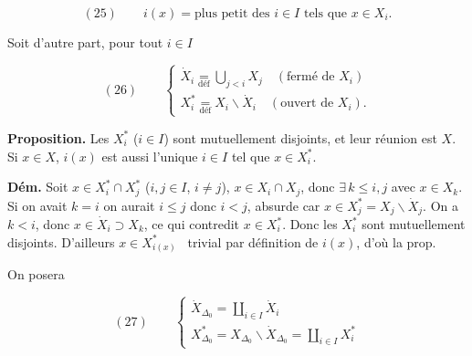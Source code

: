 \documentclass[11pt,a4paper]{article}
\begin{document}
\[
  (25) \qquad i(x) = \text{plus petit des } i \in I
  \text{ tels que } x \in X_i .
\]

Soit d'autre part, pour tout $i \in I$

\[
  (26) \qquad
  \begin{cases}
    \dot{X}_i \underset{\text{déf}}{=} \bigcup_{j < i} X_j
      \quad (\text{fermé de } X_i) \\[2pt]
    X_i^{*} \underset{\text{déf}}{=} X_i \smallsetminus \dot{X}_i
      \quad (\text{ouvert de } X_i) .
  \end{cases}
\]



\textbf{Proposition.} Les $X_i^{*}$ ($i \in I$) sont mutuellement disjoints,
et leur réunion est $X$. Si $x \in X$, $i(x)$ est aussi l'unique $i \in I$ tel
que $x \in X_i^{*}$.

\textbf{Dém.} Soit $x \in X_i^{*} \cap X_j^{*}$ ($i,j \in I$, $i \neq j$),
 $x \in X_i \cap X_j$, donc $\exists\, k \leq i,j$ \struck{\ill}
avec $x \in X_k$. Si on avait $k = i$ on aurait $i \leq j$ donc $i < j$,
absurde car $x \in X_j^{*} = X_j \smallsetminus \dot{X}_j$. \struck{\ill} On a
$k < i$, donc $x \in \dot{X}_i \supset X_k$, ce qui contredit
$x \in X_i^{*}$. Donc les $X_i^{*}$ sont mutuellement disjoints. D'ailleurs
$x \in X_{i(x)}^{*}$ \ill\ trivial par définition de $i(x)$, d'où la prop.


On posera

\[
  (27) \qquad
  \begin{cases}
    \dot{X}_{\Delta_0} = \coprod_{i \in I} \dot{X}_i \\[2pt]
    X^{*}_{\Delta_0} = X_{\Delta_0} \smallsetminus \dot{X}_{\Delta_0}
      = \coprod_{i \in I} X_i^{*}
  \end{cases}
\]
\end{document}
